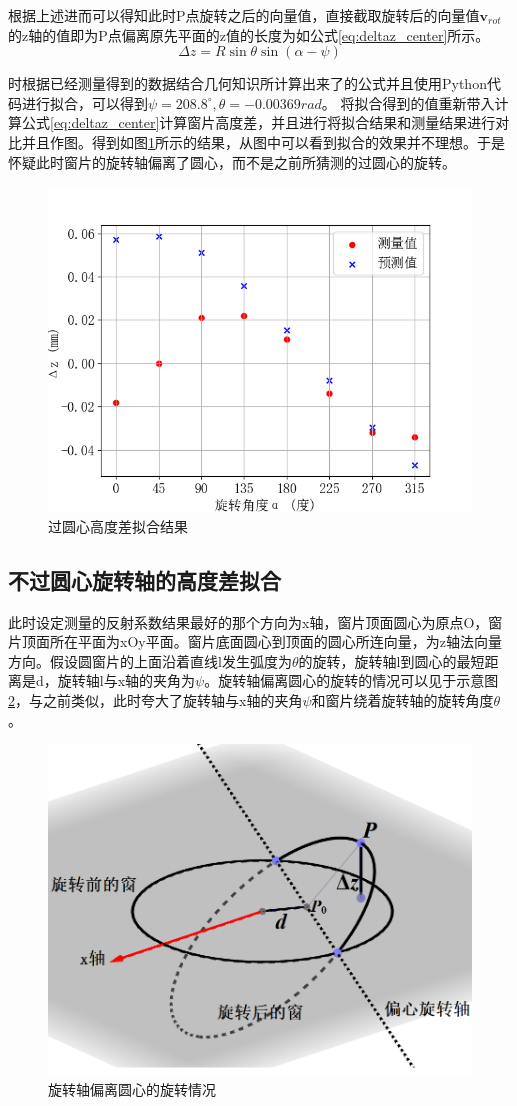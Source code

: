 \documentclass[master]{thesis-uestc}
\begin{document}
根据上述进而可以得知此时P点旋转之后的向量值，直接截取旋转后的向量值\(\mathbf{v}_{rot}\)的z轴的值即为P点偏离原先平面的z值的长度为如公式\ref{eq:deltaz_center}所示。
\begin{equation}\label{eq:deltaz_center}
    \Delta z = R \sin \theta \sin \left(\alpha -\psi \right)
\end{equation}

时根据已经测量得到的数据结合几何知识所计算出来了的公式并且使用Python代码进行拟合，可以得到\( \psi = 208.8 ^ \circ, \theta = -0.00369rad \)。
将拟合得到的值重新带入计算公式\ref{eq:deltaz_center}计算窗片高度差，并且进行将拟合结果和测量结果进行对比并且作图。得到如图\ref{fig:过圆心高度差拟合结果}所示的结果，从图中可以看到拟合的效果并不理想。于是怀疑此时窗片的旋转轴偏离了圆心，而不是之前所猜测的过圆心的旋转。
\begin{figure}[!htb]
    \centering
    \includegraphics[width=0.5\linewidth]{pic/chapter5/过圆心高度差拟合.png}
    \caption{过圆心高度差拟合结果}
    \label{fig:过圆心高度差拟合结果}
\end{figure}

\subsection{不过圆心旋转轴的高度差拟合}
此时设定测量的反射系数结果最好的那个方向为x轴，窗片顶面圆心为原点O，窗片顶面所在平面为xOy平面。窗片底面圆心到顶面的圆心所连向量，为z轴法向量方向。假设圆窗片的上面沿着直线l发生弧度为\(\theta\)的旋转，旋转轴l到圆心的最短距离是d，旋转轴l与x轴的夹角为\(\psi\)。旋转轴偏离圆心的旋转的情况可以见于示意图\ref{fig:旋转轴偏离圆心的旋转情况}，与之前类似，此时夸大了旋转轴与x轴的夹角\(\psi\)和窗片绕着旋转轴的旋转角度\(\theta\)。
\begin{figure}[!htb]
    \centering
    \includegraphics[width=0.35\linewidth]{pic/chapter5/不过圆心旋转示意图.png}
    \caption{旋转轴偏离圆心的旋转情况}
    \label{fig:旋转轴偏离圆心的旋转情况}
\end{figure}
\end{document}
